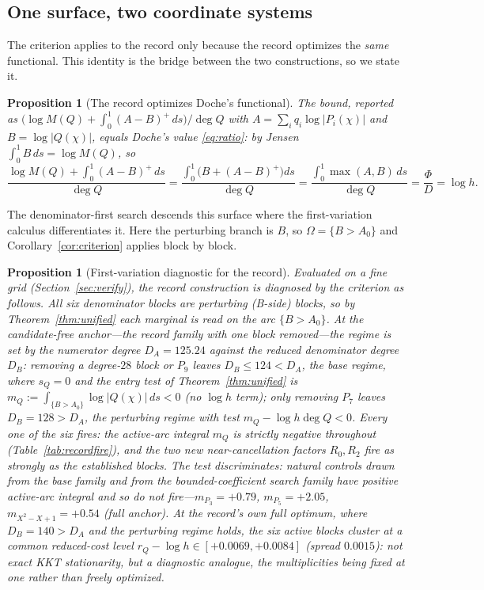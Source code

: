 \documentclass[11pt,reqno]{amsart}
\theoremstyle{plain}
\newtheorem{proposition}[theorem]{Proposition}
\theoremstyle{definition}
\newcommand{\rQ}{r_Q}
\newcommand{\dA}{D_A}
\newcommand{\dB}{D_B}
\begin{document}
\subsection*{One surface, two coordinate systems}
The criterion applies to the record only because the record optimizes the \emph{same}
functional. This identity is the bridge between the two constructions, so we state it.

\begin{proposition}[The record optimizes Doche's functional]\label{eq:samefunctional-prop}
The \citet{Gri26} bound, reported as
$\bigl(\log M(Q)+\int_0^1(A-B)^+\,ds\bigr)/\deg Q$ with $A=\sum_iq_i\log|P_i(\chi)|$ and
$B=\log|Q(\chi)|$, equals Doche's value \eqref{eq:ratio}: by Jensen
$\int_0^1 B\,ds=\log M(Q)$, so
\begin{equation}\label{eq:samefunctional}
  \frac{\log M(Q)+\int_0^1(A-B)^+\,ds}{\deg Q}
  =\frac{\int_0^1\bigl(B+(A-B)^+\bigr)ds}{\deg Q}
  =\frac{\int_0^1\max(A,B)\,ds}{\deg Q}=\frac{\Phi}{D}=\log h.
\end{equation}
\end{proposition}

The denominator-first search descends this surface where the first-variation calculus
differentiates it. Here the perturbing branch is $B$, so $\Omega=\{B>A_0\}$ and
Corollary~\ref{cor:criterion} applies block by block.

\begin{proposition}[First-variation diagnostic for the record]\label{thm:record-fires}
Evaluated on a fine grid (Section~\ref{sec:verify}), the record construction is
diagnosed by the criterion as follows. All six denominator blocks are \emph{perturbing}
(B-side) blocks, so by Theorem~\ref{thm:unified} each marginal is read on the arc
$\{B>A_0\}$. At the candidate-free anchor---the record family with one block removed---the
regime is set by the numerator degree $\dA=125.24$ against the reduced denominator degree
$\dB$: removing a degree-$28$ block or $P_9$ leaves $\dB\le124<\dA$, the \emph{base}
regime, where $s_Q=0$ and the entry test of Theorem~\ref{thm:unified} is
$m_Q:=\int_{\{B>A_0\}}\log|Q(\chi)|\,ds<0$ (no $\log h$ term); only removing $P_7$ leaves
$\dB=128>\dA$, the perturbing regime with test $m_Q-\log h\deg Q<0$. Every one of the six
fires: the active-arc integral $m_Q$ is strictly negative throughout
(Table~\ref{tab:recordfire}), and the two new near-cancellation factors $R_0,R_2$ fire as
strongly as the established blocks. The test discriminates: natural controls drawn from
the base family and from the bounded-coefficient search family have \emph{positive}
active-arc integral and so do not fire---$m_{P_3}=+0.79$, $m_{P_5}=+2.05$,
$m_{X^2-X+1}=+0.54$ (full anchor). At the record's own \emph{full} optimum, where
$\dB=140>\dA$ and the perturbing regime holds, the six active blocks cluster at a common
reduced-cost level $\rQ-\log h\in[+0.0069,+0.0084]$ (spread $0.0015$): not exact KKT
stationarity, but a diagnostic analogue, the multiplicities being fixed at one rather
than freely optimized.
\end{proposition}
\end{document}
